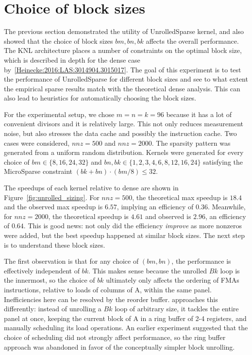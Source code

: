 \section{Choice of block sizes}

The previous section demonstrated the utility of UnrolledSparse kernel, and also showed that the choice of block sizes $bm,bn,bk$ affects the overall performance. The KNL architecture places a number of constraints on the optimal block size, which is described in depth for the dense case by~\ref{Heinecke:2016:LAS:3014904.3015017}. The goal of this experiment is to test the performance of UnrolledSparse for different block sizes and see to what extent the empirical sparse results match with the theoretical dense analysis. This can also lead to heuristics for automatically choosing the block sizes.

For the experimental setup, we chose $m=n=k=96$ because it has a lot of convenient divisors and it is relatively large. This not only reduces measurement noise, but also stresses the data cache and possibly the instruction cache. Two cases were considered, $nnz=500$ and $nnz=2000$. The sparsity pattern was generated from a uniform random distribution. Kernels were generated for every choice of $bm \in \{8,16,24,32\}$ and $bn, bk \in \{1,2,3,4,6,8,12,16,24\}$ satisfying the MicroSparse constraint $(bk+bn) \cdot (bm/8) \leq 32$. 

The speedups of each kernel relative to dense are shown in Figure~\ref{fig:unrolled_sizing}. For $nnz=500$, the theoretical max speedup is $18.4$ and the observed max speedup is $6.57$, implying an efficiency of $0.36$. Meanwhile, for $nnz=2000$, the theoretical speedup is $4.61$ and observed is $2.96$, an efficiency of $0.64$. This is good news: not only did the efficiency \emph{improve} as more nonzeros were added, but the best speedup happened at similar block sizes. The next step is to understand these block sizes.

The first observation is that for any choice of $(bm, bn)$, the performance is effectively independent of $bk$. This makes sense because the unrolled $Bk$ loop is the innermost, so the choice of $bk$ ultimately only affects the ordering of \glspl{FMA} instructions, relative to loads of columns of A, within the same panel. Inefficiencies here can be resolved by the reorder buffer.  approaches this differently: instead of unrolling a $Bk$ loop of arbitrary size, it tackles the entire panel at once, keeping the current block of A in a ring buffer of 2-4 registers, and manually scheduling its load operations. An earlier experiment suggested that the choice of scheduling did not strongly affect performance, so the ring buffer approach was abandoned in favor of the conceptually simpler block unrolling.

